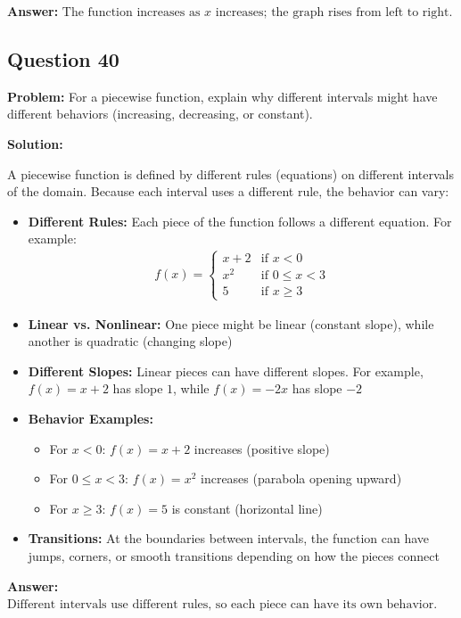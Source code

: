 \documentclass[12pt]{article}
\begin{document}
\textbf{Answer:} $\boxed{\text{The function increases as } x \text{ increases; the graph rises from left to right.}}$

\subsection*{Question 40}
\textbf{Problem:} For a piecewise function, explain why different intervals might have different behaviors (increasing, decreasing, or constant).

\textbf{Solution:}

A piecewise function is defined by different rules (equations) on different intervals of the domain. Because each interval uses a different rule, the behavior can vary:

\begin{itemize}
\item \textbf{Different Rules:} Each piece of the function follows a different equation. For example:
  \begin{align*}
  f(x) = \begin{cases}
  x + 2 & \text{if } x < 0 \\
  x^2 & \text{if } 0 \leq x < 3 \\
  5 & \text{if } x \geq 3
  \end{cases}
  \end{align*}

\item \textbf{Linear vs. Nonlinear:} One piece might be linear (constant slope), while another is quadratic (changing slope)

\item \textbf{Different Slopes:} Linear pieces can have different slopes. For example, $f(x) = x + 2$ has slope $1$, while $f(x) = -2x$ has slope $-2$

\item \textbf{Behavior Examples:}
  \begin{itemize}
  \item For $x < 0$: $f(x) = x + 2$ increases (positive slope)
  \item For $0 \leq x < 3$: $f(x) = x^2$ increases (parabola opening upward)
  \item For $x \geq 3$: $f(x) = 5$ is constant (horizontal line)
  \end{itemize}

\item \textbf{Transitions:} At the boundaries between intervals, the function can have jumps, corners, or smooth transitions depending on how the pieces connect
\end{itemize}

\textbf{Answer:} $\boxed{\text{Different intervals use different rules, so each piece can have its own behavior.}}$
\end{document}

